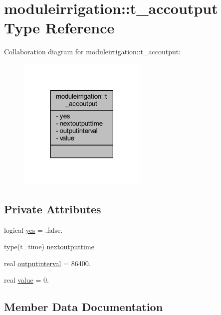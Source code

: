 \hypertarget{structmoduleirrigation_1_1t__accoutput}{}\section{moduleirrigation\+:\+:t\+\_\+accoutput Type Reference}
\label{structmoduleirrigation_1_1t__accoutput}


Collaboration diagram for moduleirrigation\+:\+:t\+\_\+accoutput\+:\nopagebreak
\begin{figure}[H]
\begin{center}
\leavevmode
\includegraphics[width=174pt]{structmoduleirrigation_1_1t__accoutput__coll__graph}
\end{center}
\end{figure}
\subsection*{Private Attributes}
\begin{DoxyCompactItemize}
\item 
logical \mbox{\hyperlink{structmoduleirrigation_1_1t__accoutput_a781bdf5d76036e881272359bacbd1ce0}{yes}} = .false.
\item 
type(t\+\_\+time) \mbox{\hyperlink{structmoduleirrigation_1_1t__accoutput_ab40790080ebd21b69bbd7c5657f7171e}{nextoutputtime}}
\item 
real \mbox{\hyperlink{structmoduleirrigation_1_1t__accoutput_aa24bb43acf41f104a6ec2f665b4befcf}{outputinterval}} = 86400.
\item 
real \mbox{\hyperlink{structmoduleirrigation_1_1t__accoutput_a79c052dfb39c4052c7786f470b6df363}{value}} = 0.
\end{DoxyCompactItemize}


\subsection{Member Data Documentation}
\mbox{\label{structmoduleirrigation_1_1t__accoutput_ab40790080ebd21b69bbd7c5657f7171e}} 
